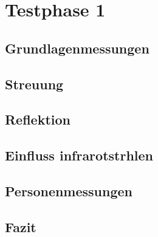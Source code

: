 \chapter{Testphase 1}
\label{chap:Testphasen}



\section{Grundlagenmessungen}



\section{Streuung}


\section{Reflektion}


\section{Einfluss infrarotstrhlen}



\section{Personenmessungen}

















\section{Fazit}